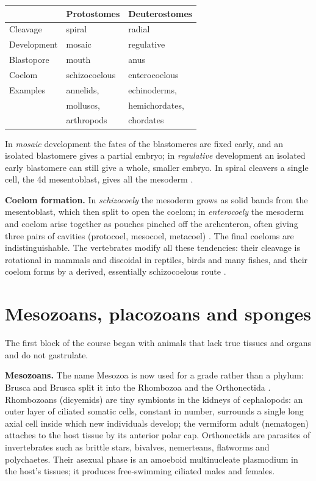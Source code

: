 \begin{center}
\begin{tabular}{lll}
& Protostomes & Deuterostomes \\
\hline
Cleavage & spiral & radial \\
Development & mosaic & regulative \\
Blastopore & mouth & anus \\
Coelom & schizocoelous & enterocoelous \\
Examples & annelids, & echinoderms, \\
& molluscs, & hemichordates, \\
& arthropods & chordates \\
\end{tabular}
\end{center}

In \emph{mosaic} development the fates of the
blastomeres are fixed early, and an isolated
blastomere gives a partial embryo; in
\emph{regulative} development an isolated
early blastomere can still give a whole,
smaller embryo. In spiral cleavers a single
cell, the 4d mesentoblast, gives all the
mesoderm \cite[Chapter 3]{hickman2002animal}.

\textbf{Coelom formation.} In
\emph{schizocoely} the mesoderm grows as
solid bands from the mesentoblast, which then
split to open the coelom; in
\emph{enterocoely} the mesoderm and coelom
arise together as pouches pinched off the
archenteron, often giving three pairs of
cavities (protocoel, mesocoel, metacoel)
\cite[Chapter 4]{brusca2003invertebrates}.
The final coeloms are indistinguishable. The
vertebrates modify all these tendencies:
their cleavage is rotational in mammals and
discoidal in reptiles, birds and many fishes,
and their coelom forms by a derived,
essentially schizocoelous route \cite[Chapter
3]{hickman2002animal}.

\section{Mesozoans, placozoans and sponges}
\label{section-early-metazoa}

The first block of the course began with
animals that lack true tissues and organs and
do not gastrulate.

\textbf{Mesozoans.} The name Mesozoa is now
used for a grade rather than a phylum: Brusca
and Brusca split it into the Rhombozoa and
the Orthonectida \cite[Chapter
7]{brusca2003invertebrates}. Rhombozoans
(dicyemids) are tiny symbionts in the kidneys
of cephalopods: an outer layer of ciliated
somatic cells, constant in number, surrounds
a single long axial cell inside which new
individuals develop; the vermiform adult
(nematogen) attaches to the host tissue by
its anterior polar cap. Orthonectids are
parasites of invertebrates such as brittle
stars, bivalves, nemerteans, flatworms and
polychaetes. Their asexual phase is an
amoeboid multinucleate plasmodium in the
host's tissues; it produces free-swimming
ciliated males and females.

